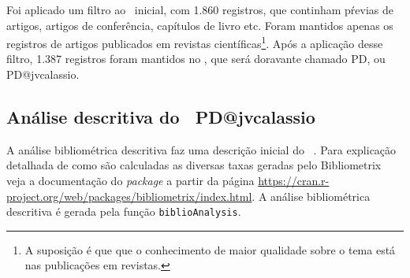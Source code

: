 Foi aplicado um filtro ao \dataset\   inicial, com 1.860 registros, que continham pŕevias de artigos, artigos de conferência, capítulos de livro etc. Foram mantidos apenas os registros de artigos publicados em revistas científicas\footnote{A suposição é que que o conhecimento de maior qualidade sobre o tema está nas publicações em revistas.}. Após a aplicação desse filtro, 1.387 registros foram mantidos no \dataset, que será doravante chamado PD, ou PD@jvcalassio.

\subsection{Análise descritiva do \dataset\   PD@jvcalassio}

A análise bibliométrica descritiva faz uma descrição inicial do \dataset\  . Para explicação detalhada de como são calculadas as diversas taxas geradas pelo Bibliometrix veja a documentação do \textit{package} a partir da página \url{https://cran.r-project.org/web/packages/bibliometrix/index.html}. A análise bibliométrica descritiva é gerada pela função \texttt{biblioAnalysis}.

